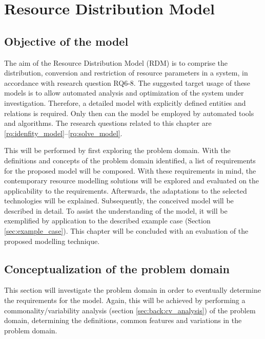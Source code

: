  

\newcommand{\rdmid}{2}
\chapter{Resource Distribution Model}
\label{ch:rdm}
\section{Objective of the model}
The aim of the Resource Distribution Model (RDM) is to comprise the distribution, conversion and restriction of resource parameters in a system, in accordance with research question RQ6-8. The suggested target usage of these models is to allow automated analysis and optimization of the system under investigation. Therefore, a detailed model with explicitly defined entities and relations is required. Only then can the model be employed by automated tools and algorithms. The research questions related to this chapter are \ref{rq:idenfity_model}--\ref{rq:solve_model}.

This will be performed by first exploring the problem domain. With the definitions and concepts of the problem domain identified, a list of requirements for the proposed model will be composed. With these requirements in mind, the contemporary resource modelling solutions will be explored and evaluated on the applicability to the requirements. Afterwards, the adaptations to the selected technologies will be explained. Subsequently, the conceived model will be described in detail. To assist the understanding of the model, it will be exemplified by application to the described example case (Section \ref{sec:example_case}). This chapter will be concluded with an evaluation of the proposed modelling technique.

\section{Conceptualization of the problem domain}
\label{sec:cv_analysis}
This section will investigate the problem domain in order to eventually determine the requirements for the model. Again, this will be achieved by performing a commonality/variability analysis (section \ref{sec:back:cv_analysis}) of the problem domain, determining the definitions, common features and variations in the problem domain.

